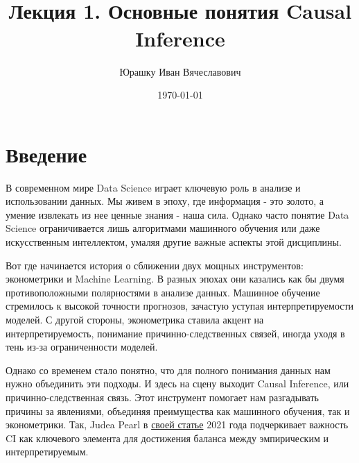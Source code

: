 \documentclass{article}
\title{
    \textbf{\coursename}\\
    Лекция 1.
    Основные понятия Causal Inference
    }
\author{Юрашку Иван Вячеславович}
\date{\today}
\begin{document}

    \maketitle

    \section*{Введение}

        В современном мире Data Science играет ключевую роль в анализе и использовании данных. Мы живем в эпоху, где информация - это золото, а умение извлекать из нее ценные знания - наша сила. Однако часто понятие Data Science ограничивается лишь алгоритмами машинного обучения или даже искусственным интеллектом, умаляя другие важные аспекты этой дисциплины.

        Вот где начинается история о сближении двух мощных инструментов: эконометрики и Machine Learning. В разных эпохах они казались как бы двумя противоположными полярностями в анализе данных. Машинное обучение стремилось к высокой точности прогнозов, зачастую уступая интерпретируемости моделей. С другой стороны, эконометрика ставила акцент на интерпретируемость, понимание причинно-следственных связей, иногда уходя в тень из-за ограниченности моделей.

        Однако со временем стало понятно, что для полного понимания данных нам нужно объединить эти подходы. И здесь на сцену выходит Causal Inference, или причинно-следственная связь. Этот инструмент помогает нам разгадывать причины за явлениями, объединяя преимущества как машинного обучения, так и эконометрики. Так, Judea Pearl в \href{https://www.degruyter.com/document/doi/10.1515/jci-2021-0006/html}{своей статье} 2021 года подчеркивает важность CI как ключевого элемента для достижения баланса между эмпирическим и интерпретируемым.
\end{document}
